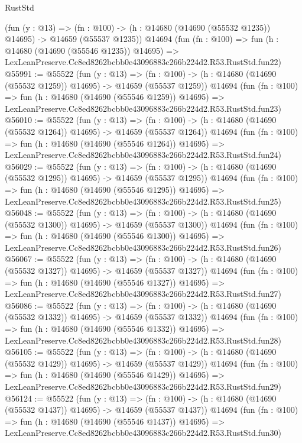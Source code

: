 \begin{lexlean}{RustStd}
\begin{coremodule}
    (fun (y : @13) =>
    (fn : @100) -> (h : @14680 (@14690 (@55532 @1235)) @14695) -> @14659 (@55537 @1235))
    @14694
    (fun (fn : @100) =>
    fun (h : @14680 (@14690 (@55546 @1235)) @14695) =>
    LexLeanPreserve.Cc8ed8262bcbb0e43096883c266b224d2.R53.RustStd.fun22)
@55991 := @55522
    (fun (y : @13) =>
    (fn : @100) -> (h : @14680 (@14690 (@55532 @1259)) @14695) -> @14659 (@55537 @1259))
    @14694
    (fun (fn : @100) =>
    fun (h : @14680 (@14690 (@55546 @1259)) @14695) =>
    LexLeanPreserve.Cc8ed8262bcbb0e43096883c266b224d2.R53.RustStd.fun23)
@56010 := @55522
    (fun (y : @13) =>
    (fn : @100) -> (h : @14680 (@14690 (@55532 @1264)) @14695) -> @14659 (@55537 @1264))
    @14694
    (fun (fn : @100) =>
    fun (h : @14680 (@14690 (@55546 @1264)) @14695) =>
    LexLeanPreserve.Cc8ed8262bcbb0e43096883c266b224d2.R53.RustStd.fun24)
@56029 := @55522
    (fun (y : @13) =>
    (fn : @100) -> (h : @14680 (@14690 (@55532 @1295)) @14695) -> @14659 (@55537 @1295))
    @14694
    (fun (fn : @100) =>
    fun (h : @14680 (@14690 (@55546 @1295)) @14695) =>
    LexLeanPreserve.Cc8ed8262bcbb0e43096883c266b224d2.R53.RustStd.fun25)
@56048 := @55522
    (fun (y : @13) =>
    (fn : @100) -> (h : @14680 (@14690 (@55532 @1300)) @14695) -> @14659 (@55537 @1300))
    @14694
    (fun (fn : @100) =>
    fun (h : @14680 (@14690 (@55546 @1300)) @14695) =>
    LexLeanPreserve.Cc8ed8262bcbb0e43096883c266b224d2.R53.RustStd.fun26)
@56067 := @55522
    (fun (y : @13) =>
    (fn : @100) -> (h : @14680 (@14690 (@55532 @1327)) @14695) -> @14659 (@55537 @1327))
    @14694
    (fun (fn : @100) =>
    fun (h : @14680 (@14690 (@55546 @1327)) @14695) =>
    LexLeanPreserve.Cc8ed8262bcbb0e43096883c266b224d2.R53.RustStd.fun27)
@56086 := @55522
    (fun (y : @13) =>
    (fn : @100) -> (h : @14680 (@14690 (@55532 @1332)) @14695) -> @14659 (@55537 @1332))
    @14694
    (fun (fn : @100) =>
    fun (h : @14680 (@14690 (@55546 @1332)) @14695) =>
    LexLeanPreserve.Cc8ed8262bcbb0e43096883c266b224d2.R53.RustStd.fun28)
@56105 := @55522
    (fun (y : @13) =>
    (fn : @100) -> (h : @14680 (@14690 (@55532 @1429)) @14695) -> @14659 (@55537 @1429))
    @14694
    (fun (fn : @100) =>
    fun (h : @14680 (@14690 (@55546 @1429)) @14695) =>
    LexLeanPreserve.Cc8ed8262bcbb0e43096883c266b224d2.R53.RustStd.fun29)
@56124 := @55522
    (fun (y : @13) =>
    (fn : @100) -> (h : @14680 (@14690 (@55532 @1437)) @14695) -> @14659 (@55537 @1437))
    @14694
    (fun (fn : @100) =>
    fun (h : @14680 (@14690 (@55546 @1437)) @14695) =>
    LexLeanPreserve.Cc8ed8262bcbb0e43096883c266b224d2.R53.RustStd.fun30)

\end{coremodule}
\end{lexlean}

